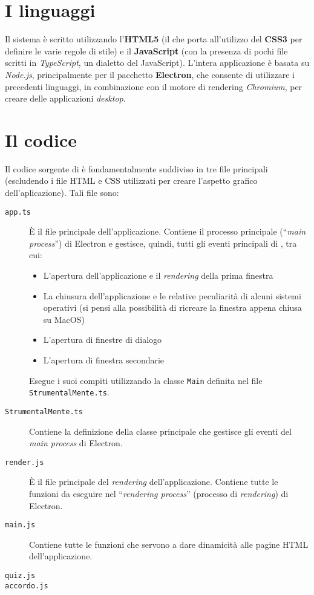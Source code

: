 \section{I linguaggi}
Il sistema \ProjectTitle{} è scritto utilizzando l'\textbf{HTML5} (il che porta
all'utilizzo del \textbf{CSS3} per definire le varie regole di stile) e il
\textbf{JavaScript} (con la presenza di pochi file scritti in
\textit{TypeScript}, un dialetto del JavaScript). L'intera applicazione è basata
su \emph{Node.js}, principalmente per il pacchetto \textbf{Electron}, che
consente di utilizzare i precedenti linguaggi, in combinazione con il motore di
rendering \emph{Chromium}, per creare delle applicazioni \textit{desktop}.

\section{Il codice}
Il codice sorgente di \ProjectTitle{} è fondamentalmente suddiviso in tre file
principali (escludendo i file HTML e CSS utilizzati per creare l'aspetto grafico
dell'aplicazione). Tali file sono:
\begin{description}
	\item[\texttt{app.ts}] È il file principale dell'applicazione. Contiene il
	processo principale (``\emph{main process}'') di Electron e gestisce,
	quindi, tutti gli eventi principali di \ProjectTitle{}, tra cui:
	\begin{itemize}
		\item L'apertura dell'applicazione e il \emph{rendering} della prima
		finestra
		\item La chiusura dell'applicazione e le relative peculiarità di alcuni
		sistemi operativi (si pensi alla possibilità di ricreare la finestra
		appena chiusa su MacOS)
		\item L'apertura di finestre di dialogo
		\item L'apertura di finestra secondarie
	\end{itemize} 
	Esegue i suoi compiti utilizzando la classe \texttt{Main} definita nel file
	\texttt{StrumentalMente.ts}.
	\item[\texttt{StrumentalMente.ts}] Contiene la definizione della classe
	principale che gestisce gli eventi del \textit{main process} di Electron.
	\item[\texttt{render.js}] È il file principale del \emph{rendering}
	dell'applicazione. Contiene tutte le funzioni da eseguire nel
	``\emph{rendering process}'' (processo di \emph{rendering}) di Electron.
	\item[\texttt{main.js}] Contiene tutte le funzioni che servono a dare
	dinamicità alle pagine HTML dell'applicazione.
	\item[\texttt{quiz.js}]
	\item[\texttt{accordo.js}]
\end{description}